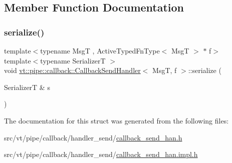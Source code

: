 \subsection{Member Function Documentation}
\mbox{\label{structvt_1_1pipe_1_1callback_1_1_callback_send_handler_ae1229f253b82ad716c9a3b0f0b675684}} 
\subsubsection{\texorpdfstring{serialize()}{serialize()}}
{\footnotesize\ttfamily template$<$typename MsgT , Active\+Typed\+Fn\+Type$<$ Msg\+T $>$ $\ast$ f$>$ \\
template$<$typename SerializerT $>$ \\
void \hyperlink{structvt_1_1pipe_1_1callback_1_1_callback_send_handler}{vt\+::pipe\+::callback\+::\+Callback\+Send\+Handler}$<$ MsgT, f $>$\+::serialize (\begin{DoxyParamCaption}\item[{SerializerT \&}]{s }\end{DoxyParamCaption})}



The documentation for this struct was generated from the following files\+:\begin{DoxyCompactItemize}
\item 
src/vt/pipe/callback/handler\+\_\+send/\hyperlink{callback__send__han_8h}{callback\+\_\+send\+\_\+han.\+h}\item 
src/vt/pipe/callback/handler\+\_\+send/\hyperlink{callback__send__han_8impl_8h}{callback\+\_\+send\+\_\+han.\+impl.\+h}\end{DoxyCompactItemize}
